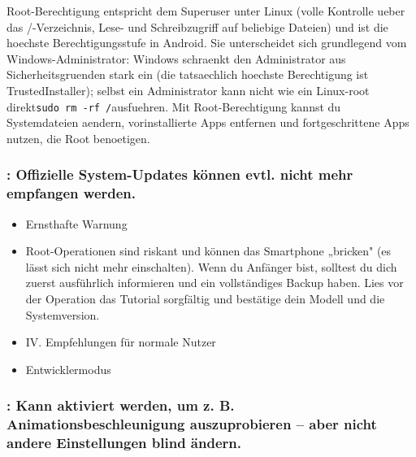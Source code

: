 
Root-Berechtigung entspricht dem Superuser unter Linux (volle Kontrolle ueber das /-Verzeichnis, Lese- und Schreibzugriff auf beliebige Dateien) und ist die hoechste Berechtigungsstufe in Android. Sie unterscheidet sich grundlegend vom Windows-Administrator: Windows schraenkt den Administrator aus Sicherheitsgruenden stark ein (die tatsaechlich hoechste Berechtigung ist TrustedInstaller); selbst ein Administrator kann nicht wie ein Linux-root direkt\texttt{sudo rm -\allowbreak rf /\allowbreak *}ausfuehren. Mit Root-Berechtigung kannst du Systemdateien aendern, vorinstallierte Apps entfernen und fortgeschrittene Apps nutzen, die Root benoetigen.

\subsubsection*{: Offizielle System-Updates können evtl. nicht mehr empfangen werden.}

\begin{itemize}
  \item Ernsthafte Warnung
  \item Root-Operationen sind riskant und können das Smartphone „bricken" (es lässt sich nicht mehr einschalten). Wenn du Anfänger bist, solltest du dich zuerst ausführlich informieren und ein vollständiges Backup haben. Lies vor der Operation das Tutorial sorgfältig und bestätige dein Modell und die Systemversion.
  \item IV. Empfehlungen für normale Nutzer
  \item Entwicklermodus
\end{itemize}

\subsubsection*{: Kann aktiviert werden, um z. B. Animationsbeschleunigung auszuprobieren – aber nicht andere Einstellungen blind ändern.}

